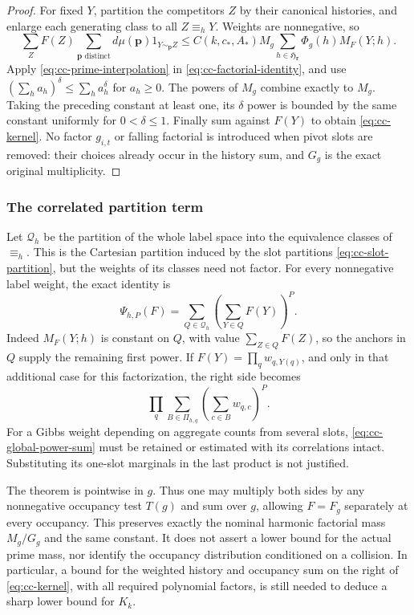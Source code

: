 \begin{proof}
For fixed $Y$, partition the competitors $Z$ by their canonical
histories, and enlarge each generating class to all $Z\equiv_hY$.
Weights are nonnegative, so
\[
 \sum_ZF(Z)\sum_{\mathbf p\text{ distinct}}d\mu(\mathbf p)
                         1_{Y\sim_{\mathbf p}Z}
 \le C(k,c_*,A_*)M_g
            \sum_{h\in\mathfrak H_{\mathbf r}}\Phi_g(h)M_F(Y;h).
\]
Apply \eqref{eq:cc-prime-interpolation} in
\eqref{eq:cc-factorial-identity}, and use
$(\sum_h a_h)^\delta\le\sum_h a_h^\delta$ for $a_h\ge0$.
The powers of $M_g$ combine exactly to $M_g$.
Taking the preceding constant at least one, its $\delta$ power is
bounded by the same constant uniformly for $0<\delta\le1$.
Finally sum against $F(Y)$ to obtain \eqref{eq:cc-kernel}.
No factor $g_{i,t}$ or falling factorial is introduced when pivot
slots are removed: their choices already occur in the history sum,
and $G_g$ is the exact original multiplicity.
\end{proof}

\subsubsection{The correlated partition term}
Let $\mathcal Q_h$ be the partition of the whole label space into
the equivalence classes of $\equiv_h$. This is the Cartesian
partition induced by the slot partitions \eqref{eq:cc-slot-partition},
but the weights of its classes need not factor. For every
nonnegative label weight, the exact identity is
\begin{equation}\label{eq:cc-global-power-sum}
 \Psi_{h,P}(F)
       =\sum_{Q\in\mathcal Q_h}\left(\sum_{Y\in Q}F(Y)\right)^P.
\end{equation}
Indeed $M_F(Y;h)$ is constant on $Q$, with value
$\sum_{Z\in Q}F(Z)$, so the anchors in $Q$ supply the remaining
first power. If $F(Y)=\prod_qw_{q,Y(q)}$, and only in that
additional case for this factorization, the right side becomes
\[
        \prod_q\sum_{B\in\Pi_{h,q}}
                          \left(\sum_{c\in B}w_{q,c}\right)^P.
\]
For a Gibbs weight depending on aggregate counts from several slots,
\eqref{eq:cc-global-power-sum} must be retained or estimated with
its correlations intact. Substituting its one-slot marginals in the
last product is not justified.

The theorem is pointwise in $g$. Thus one may multiply both sides
by any nonnegative occupancy test $T(g)$ and sum over $g$, allowing
$F=F_g$ separately at every occupancy. This preserves exactly the
nominal harmonic factorial mass $M_g/G_g$ and the same constant.
It does not assert a lower bound for the actual prime mass, nor
identify the occupancy distribution conditioned on a collision.
In particular, a bound for the weighted history and occupancy sum
on the right of \eqref{eq:cc-kernel}, with all required polynomial
factors, is still needed to deduce a sharp lower bound for $K_k$.

